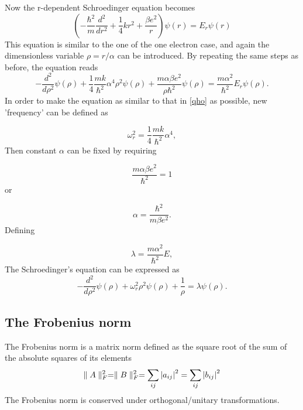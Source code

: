\documentclass[%
reprint,
amsmath,amssymb,
aps,
]{revtex4-1}
\begin{document}
\par Now the r-dependent Schroedinger equation becomes 
\begin{equation*}
    \left(-\frac{\hbar^2}{m}\frac{d^2}{dr^2}+\frac{1}{4}kr^2+\frac{\beta e^2}{r}\right)\psi(r) = E_r\psi(r)
\end{equation*}
This equation is similar to the one of the one electron case, and again the dimensionless variable $\rho = r/\alpha$ can be introduced. By repeating the same
steps as before, the equation reads
\begin{equation*}
  -\frac{d^2}{d\rho^2} \psi(\rho) 
       + \frac{1}{4}\frac{mk}{\hbar^2} \alpha^4\rho^2\psi(\rho)+\frac{m\alpha \beta e^2}{\rho\hbar^2}\psi(\rho)  = 
\frac{m\alpha^2}{\hbar^2}E_r \psi(\rho).
\end{equation*}
In order to make the equation as similar to that in \ref{qho}
as possible, new 'frequency' can be defined as

\begin{equation*}
\omega_r^2=\frac{1}{4}\frac{mk}{\hbar^2} \alpha^4,
\end{equation*}
Then constant $\alpha$ can be fixed by requiring

\begin{equation*}
\frac{m\alpha \beta e^2}{\hbar^2}=1
\end{equation*}
or

\begin{equation*}
\alpha = \frac{\hbar^2}{m\beta e^2}.
\end{equation*}
Defining

\begin{equation*}
\lambda = \frac{m\alpha^2}{\hbar^2}E,
\end{equation*}
The Schroedinger's equation can be expressed as
\begin{equation}\label{qho2}
  -\frac{d^2}{d\rho^2} \psi(\rho) + \omega_r^2\rho^2\psi(\rho) +\frac{1}{\rho} = \lambda \psi(\rho).
\end{equation}


\subsection{The Frobenius norm} \noindent 
The Frobenius norm is a matrix norm defined as the square root of the sum of the absolute squares of its elements 
\begin{equation}\label{forb}
\parallel A \parallel_F^2 = \parallel B \parallel_F^2 = \sum_{ij} \abs{a_{ij}}^2 = \sum_{ij} \abs{b_{ij}}^2
\end{equation}
The Frobenius norm is conserved under orthogonal/unitary transformations. 
\newpage 
\end{document}

